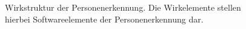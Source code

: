 \begin{figure}[H]
\begin{center}
\begin{tikzpicture}
\end{tikzpicture}
\caption{Wirkstruktur der Personenerkennung. Die Wirkelemente stellen hierbei Softwareelemente der Personenerkennung dar.}
\label{fig: consenspers}
\end{center}
\end{figure}